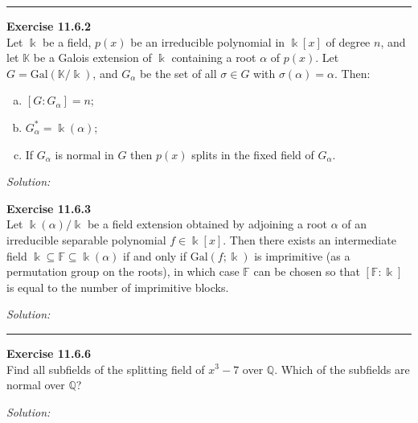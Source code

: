 \documentclass[a4paper, 12pt]{article}
\newenvironment{problem}[2][Exercise]
    { \begin{mdframed}[backgroundcolor=gray!20] \textbf{#1 #2} \\}
    {  \end{mdframed}}
\newenvironment{solution}
    {\textit{Solution:}}
    {}
\newcommand{\Gal}{\text{Gal}}
\begin{document}
\noindent\rule{7in}{2.8pt}
\begin{problem}{11.6.2}
Let \(\Bbbk\) be a field, \(p(x)\) be an irreducible polynomial in \(\Bbbk[x]\) of degree \(n\), and let \(\mathbb{K}\) be a Galois extension of \(\Bbbk\) containing a root \(\alpha\) of \(p(x)\). Let \(G=\Gal(\mathbb{K}/\Bbbk)\), 
and \(G_\alpha\) be the set of all \(\sigma\in G\) with \(\sigma(\alpha)=\alpha\). Then: 
\begin{enumerate}[(a)]
\item \([G:G_\alpha]=n\);
\item \(G_\alpha^*=\Bbbk(\alpha)\);
\item If \(G_\alpha\) is normal in \(G\) then \(p(x)\) splits in the fixed field of \(G_\alpha\).
\end{enumerate}
\end{problem}
\begin{solution}
    
\end{solution}
\begin{problem}{11.6.3}
Let \(\Bbbk(\alpha)/\Bbbk\) be a field extension obtained by adjoining a root \(\alpha\) of an irreducible separable polynomial \(f\in \Bbbk[x]\). 
Then there exists an intermediate field \(\Bbbk\subseteq \mathbb{F}\subseteq \Bbbk(\alpha)\) if and only if \(\Gal(f;\Bbbk)\) is imprimitive (as a permutation group on the roots), in which case \(\mathbb{F}\) can be chosen so that 
\([\mathbb{F}:\Bbbk]\) is equal to the number of imprimitive blocks.
\end{problem}
\begin{solution}

\end{solution}

\noindent\rule{7in}{2.8pt}
\begin{problem}{11.6.6}
Find all subfields of the splitting field of \(x^3-7\) over \(\mathbb{Q}\). Which of the subfields are normal over \(\mathbb{Q}\)?
\end{problem}
\begin{solution}
    
\end{solution}
\end{document}
